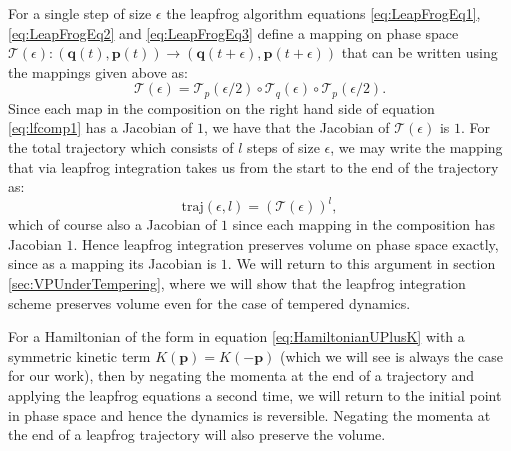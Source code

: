 \documentclass[12pt]{article}
\begin{document}
            For a single step of size $\epsilon$ the leapfrog algorithm equations \ref{eq:LeapFrogEq1}, \ref{eq:LeapFrogEq2} and \ref{eq:LeapFrogEq3} define a mapping on phase space $\mathcal{T}\left(\epsilon\right): \left(\bm{q}\left(t\right),\bm{p}\left(t\right)\right) \rightarrow \left(\bm{q}\left(t+\epsilon\right),\bm{p}\left(t+\epsilon\right)\right)$ that can be written using the mappings given above as:
            \begin{equation}
                \label{eq:lfcomp1}
                \mathcal{T}\left(\epsilon\right)=\mathcal{T}_p\left(\epsilon/2\right)\circ \mathcal{T}_q\left(\epsilon\right)\circ \mathcal{T}_p\left(\epsilon/2\right).
            \end{equation}
            Since each map in the composition on the right hand side of equation \ref{eq:lfcomp1} has a Jacobian of $1$, we have that the Jacobian of $\mathcal{T}\left(\epsilon\right)$ is $1$. For the total trajectory which consists of $l$ steps of size $\epsilon$, we may write the mapping that via leapfrog integration takes us from the start to the end of the trajectory as:
            \begin{equation}
                \text{traj}\left(\epsilon,l\right) = \left(\mathcal{T}\left(\epsilon\right)\right)^l,
            \end{equation}
            which of course also a Jacobian of $1$ since each mapping in the composition has Jacobian $1$. Hence leapfrog integration preserves volume on phase space exactly, since as a mapping its Jacobian is $1$. We will return to this argument in section \ref{sec:VPUnderTempering}, where we will show that the leapfrog integration scheme preserves volume even for the case of tempered dynamics. 
            
            For a Hamiltonian of the form in equation \ref{eq:HamiltonianUPlusK} with a symmetric kinetic term $K\left(\bm{p}\right)=K\left(-\bm{p}\right)$ (which we will see is always the case for our work), then by negating the momenta at the end of a trajectory and applying the leapfrog equations a second time, we will return to the initial point in phase space and hence the dynamics is reversible. Negating the momenta at the end of a leapfrog trajectory will also preserve the volume.



        
\end{document}
